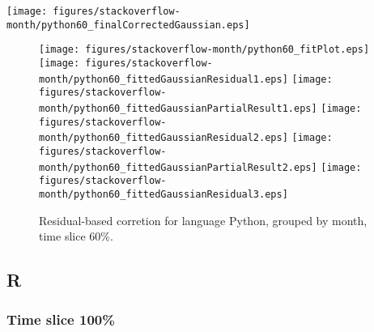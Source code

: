 \begin{center}
{\texttt{[image: figures/stackoverflow-month/python60\_finalCorrectedGaussian.eps]}}
\end{center}

\FloatBarrier

\begin{figure}[t]
\centering
{}
{\texttt{[image: figures/stackoverflow-month/python60\_fitPlot.eps]}}
{\texttt{[image: figures/stackoverflow-month/python60\_fittedGaussianResidual1.eps]}}
{\texttt{[image: figures/stackoverflow-month/python60\_fittedGaussianPartialResult1.eps]}}
{\texttt{[image: figures/stackoverflow-month/python60\_fittedGaussianResidual2.eps]}}
{\texttt{[image: figures/stackoverflow-month/python60\_fittedGaussianPartialResult2.eps]}}
{\texttt{[image: figures/stackoverflow-month/python60\_fittedGaussianResidual3.eps]}}
\caption{Residual-based corretion for language Python, grouped by month, time slice 60\%.}
\end{figure}


\FloatBarrier


\subsection{R}

\subsubsection{Time slice 100\%}


